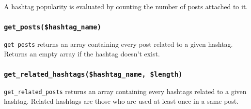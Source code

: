 \documentclass[twoside,a4paper,12pt]{article}
\begin{document}
A hashtag popularity is evaluated by counting the number of posts attached to it.

\subsubsection{\texttt{get\_posts(\$hashtag\_name)}}
\texttt{get\_posts} returns an array containing every post related to a given hashtag. Returns an empty array if the hashtag doesn't exist.

\subsubsection{\texttt{get\_related\_hashtags(\$hashtag\_name, \$length)}}
\texttt{get\_related\_posts} returns an array containing every hashtags related to a given hashtag. Related hashtags are those who are used at least once in a same post.
\end{document}
